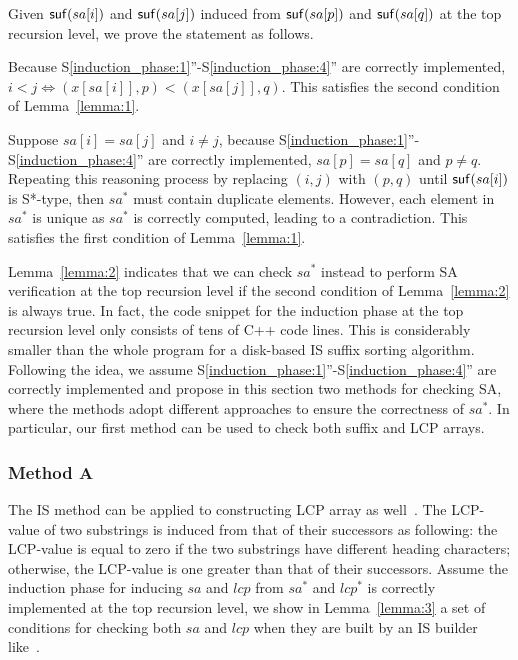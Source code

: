 \documentclass[10pt,journal,compsoc]{IEEEtran}
\begin{document}
\begin{IEEEproof} Given ${\sf suf}(sa[i])$ and ${\sf suf}(sa[j])$ induced from ${\sf suf}(sa[p])$ and ${\sf suf}(sa[q])$ at the top recursion level, we prove the statement as follows.

Because S\ref{induction_phase:1}''-S\ref{induction_phase:4}'' are correctly implemented, $i < j \iff (x[sa[i]], p) < (x[sa[j]], q)$. This satisfies the second condition of Lemma~\ref{lemma:1}.

Suppose $sa[i] = sa[j]$ and $i \ne j$, because S\ref{induction_phase:1}''-S\ref{induction_phase:4}'' are correctly implemented, $sa[p] = sa[q]$ and $p \ne q$. Repeating this reasoning process by replacing $(i, j)$ with $(p, q)$ until ${\sf suf}(sa[i])$ is S*-type, then $sa^*$ must contain duplicate elements. However, each element in $sa^*$ is unique as $sa^*$ is correctly computed, leading to a contradiction. This satisfies the first condition of Lemma~\ref{lemma:1}.

\end{IEEEproof}

Lemma~\ref{lemma:2} indicates that we can check $sa^*$ instead to perform SA verification at the top recursion level if the second condition of Lemma~\ref{lemma:2} is always true. In fact, the code snippet for the induction phase at the top recursion level only consists of tens of C++ code lines. This is considerably smaller than the whole program for a disk-based IS suffix sorting algorithm. Following the idea, we assume S\ref{induction_phase:1}''-S\ref{induction_phase:4}'' are correctly implemented and propose in this section two methods for checking SA, where the methods adopt different approaches to ensure the correctness of $sa^*$. In particular, our first method can be used to check both suffix and LCP arrays.

\subsubsection{Method A} \label{sec:proposals:method_a}

The IS method can be applied to constructing LCP array as well~\cite{Fischer11}. The LCP-value of two substrings is induced from that of their successors as following: the LCP-value is equal to zero if the two substrings have different heading characters; otherwise, the LCP-value is one greater than that of their successors. Assume the induction phase for inducing $sa$ and $lcp$ from $sa^*$ and $lcp^*$ is correctly implemented at the top recursion level, we show in Lemma~\ref{lemma:3} a set of conditions for checking both $sa$ and $lcp$ when they are built by an IS builder like~\cite{Fischer11, Bingmann12}.
\end{document}
